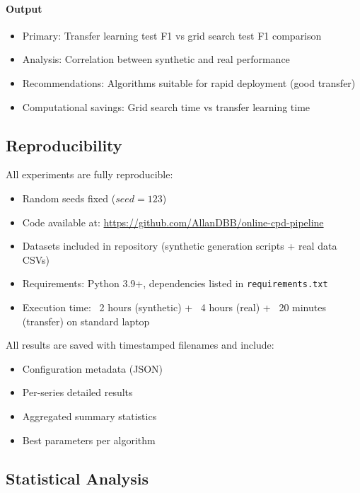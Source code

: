 \documentclass[journal,article,submit,pdftex,moreauthors]{Definitions/mdpi}
\begin{document}
\paragraph{Output}

\begin{itemize}
    \item Primary: Transfer learning test F1 vs grid search test F1 comparison
    \item Analysis: Correlation between synthetic and real performance
    \item Recommendations: Algorithms suitable for rapid deployment (good transfer)
    \item Computational savings: Grid search time vs transfer learning time
\end{itemize}

\subsection{Reproducibility}
\label{sec:reproducibility}

All experiments are fully reproducible:
\begin{itemize}
    \item Random seeds fixed ($seed=123$)
    \item Code available at: \url{https://github.com/AllanDBB/online-cpd-pipeline}
    \item Datasets included in repository (synthetic generation scripts + real data CSVs)
    \item Requirements: Python 3.9+, dependencies listed in \texttt{requirements.txt}
    \item Execution time: ~2 hours (synthetic) + ~4 hours (real) + ~20 minutes (transfer) on standard laptop
\end{itemize}

All results are saved with timestamped filenames and include:
\begin{itemize}
    \item Configuration metadata (JSON)
    \item Per-series detailed results
    \item Aggregated summary statistics
    \item Best parameters per algorithm
\end{itemize}

\subsection{Statistical Analysis}
\label{sec:statistical_analysis}
\end{document}
